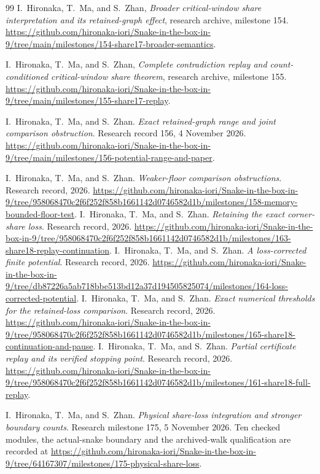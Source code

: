 \documentclass[11pt,a4paper]{article}
\theoremstyle{definition}
\theoremstyle{remark}
\begin{document}
\begin{thebibliography}{99}
I.~Hironaka, T.~Ma, and S.~Zhan, \emph{Broader critical-window share
interpretation and its retained-graph effect}, research archive, milestone 154.
\url{https://github.com/hironaka-iori/Snake-in-the-box-in-9/tree/main/milestones/154-share17-broader-semantics}.

I.~Hironaka, T.~Ma, and S.~Zhan, \emph{Complete contradiction replay and
count-conditioned critical-window share theorem}, research archive,
milestone 155.
\url{https://github.com/hironaka-iori/Snake-in-the-box-in-9/tree/main/milestones/155-share17-replay}.

I.~Hironaka, T.~Ma, and S.~Zhan. \emph{Exact retained-graph range and
joint comparison obstruction}. Research record 156, 4 November 2026.
\url{https://github.com/hironaka-iori/Snake-in-the-box-in-9/tree/main/milestones/156-potential-range-and-paper}.


I.~Hironaka, T.~Ma, and S.~Zhan. \emph{Weaker-floor comparison obstructions}. Research record, 2026.
\url{https://github.com/hironaka-iori/Snake-in-the-box-in-9/tree/958068470c2f6f252f858b1661142d0746582d1b/milestones/158-memory-bounded-floor-test}.
I.~Hironaka, T.~Ma, and S.~Zhan. \emph{Retaining the exact corner-share loss}. Research record, 2026.
\url{https://github.com/hironaka-iori/Snake-in-the-box-in-9/tree/958068470c2f6f252f858b1661142d0746582d1b/milestones/163-share18-replay-continuation}.
I.~Hironaka, T.~Ma, and S.~Zhan. \emph{A loss-corrected finite potential}. Research record, 2026.
\url{https://github.com/hironaka-iori/Snake-in-the-box-in-9/tree/db87226a5ab718bbe513bd12a37d194505825074/milestones/164-loss-corrected-potential}.
I.~Hironaka, T.~Ma, and S.~Zhan. \emph{Exact numerical thresholds for the retained-loss comparison}. Research record, 2026.
\url{https://github.com/hironaka-iori/Snake-in-the-box-in-9/tree/958068470c2f6f252f858b1661142d0746582d1b/milestones/165-share18-continuation-and-pause}.
I.~Hironaka, T.~Ma, and S.~Zhan. \emph{Partial certificate replay and its verified stopping point}. Research record, 2026.
\url{https://github.com/hironaka-iori/Snake-in-the-box-in-9/tree/958068470c2f6f252f858b1661142d0746582d1b/milestones/161-share18-full-replay}.

I.~Hironaka, T.~Ma, and S.~Zhan. \emph{Physical share-loss integration and stronger boundary counts}. Research milestone 175, 5 November 2026. Ten checked modules, the actual-snake boundary and the archived-walk qualification are recorded at
\url{https://github.com/hironaka-iori/Snake-in-the-box-in-9/tree/64167307/milestones/175-physical-share-loss}.


\end{thebibliography}
\end{document}
